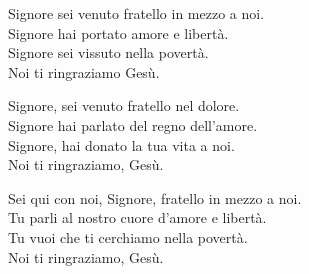 
\strofa Signore sei venuto fratello in mezzo a noi.\\
Signore hai portato amore e libertà.\\
Signore sei vissuto nella povertà.\\
Noi ti ringraziamo Gesù.

\spazio


\spazio

\strofa Signore, sei venuto fratello nel dolore.\\
Signore hai parlato del regno dell'amore.\\
Signore, hai donato la tua vita a noi.\\
Noi ti ringraziamo, Gesù.

\spazio


\spazio

\strofa Sei qui con noi, Signore, fratello in mezzo a noi.\\
Tu parli al nostro cuore d'amore e libertà.\\
Tu vuoi che ti cerchiamo nella povertà.\\
Noi ti ringraziamo, Gesù.

\spazio

